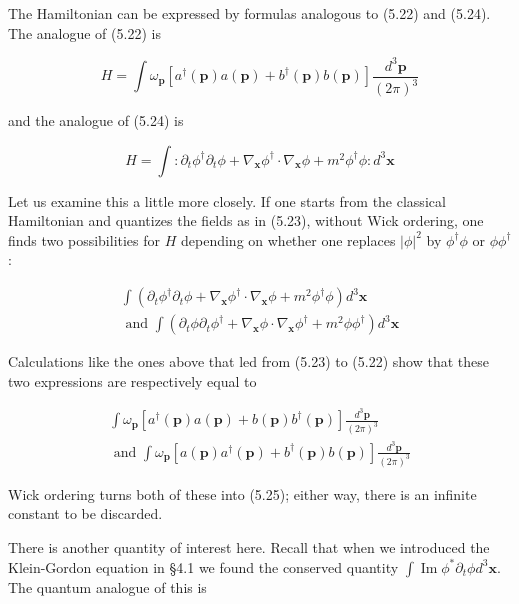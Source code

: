 \documentclass[10pt, letterpaper]{article}
\begin{document}
The Hamiltonian can be expressed by formulas analogous to (5.22) and (5.24). The analogue of (5.22) is

$$
H=\int \omega_{\mathbf{p}}\left[a^{\dagger}(\mathbf{p}) a(\mathbf{p})+b^{\dagger}(\mathbf{p}) b(\mathbf{p})\right] \frac{d^{3} \mathbf{p}}{(2 \pi)^{3}}
$$

and the analogue of (5.24) is

$$
H=\int: \partial_{t} \phi^{\dagger} \partial_{t} \phi+\nabla_{\mathbf{x}} \phi^{\dagger} \cdot \nabla_{\mathbf{x}} \phi+m^{2} \phi^{\dagger} \phi: d^{3} \mathbf{x}
$$

Let us examine this a little more closely. If one starts from the classical Hamiltonian and quantizes the fields as in (5.23), without Wick ordering, one finds two possibilities for $H$ depending on whether one replaces $|\phi|^{2}$ by $\phi^{\dagger} \phi$ or $\phi \phi^{\dagger}$ :

$$
\begin{array}{r}
\int\left(\partial_{t} \phi^{\dagger} \partial_{t} \phi+\nabla_{\mathbf{x}} \phi^{\dagger} \cdot \nabla_{\mathbf{x}} \phi+m^{2} \phi^{\dagger} \phi\right) d^{3} \mathbf{x} \\
\text { and } \int\left(\partial_{t} \phi \partial_{t} \phi^{\dagger}+\nabla_{\mathbf{x}} \phi \cdot \nabla_{\mathbf{x}} \phi^{\dagger}+m^{2} \phi \phi^{\dagger}\right) d^{3} \mathbf{x}
\end{array}
$$

Calculations like the ones above that led from (5.23) to (5.22) show that these two expressions are respectively equal to

$$
\begin{array}{r}
\int \omega_{\mathbf{p}}\left[a^{\dagger}(\mathbf{p}) a(\mathbf{p})+b(\mathbf{p}) b^{\dagger}(\mathbf{p})\right] \frac{d^{3} \mathbf{p}}{(2 \pi)^{3}} \\
\text { and } \int \omega_{\mathbf{p}}\left[a(\mathbf{p}) a^{\dagger}(\mathbf{p})+b^{\dagger}(\mathbf{p}) b(\mathbf{p})\right] \frac{d^{3} \mathbf{p}}{(2 \pi)^{3}}
\end{array}
$$

Wick ordering turns both of these into (5.25); either way, there is an infinite constant to be discarded.

There is another quantity of interest here. Recall that when we introduced the Klein-Gordon equation in §4.1 we found the conserved quantity $\int \operatorname{Im} \phi^{*} \partial_{t} \phi d^{3} \mathbf{x}$. The quantum analogue of this is
\end{document}
